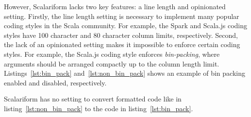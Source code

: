 However, Scalariform lacks two key features: a line length and opinionated setting.
Firstly, the line length setting is necessary to implement many popular coding styles in the Scala community.
For example, the Spark\autocite{xin_spark_2015} and Scala.js\autocite{doeraene_scala.js_2015} coding styles have 100 character and 80 character column limits, respectively.
Second, the lack of an opinionated setting makes it impossible to enforce certain coding styles.
For example, the Scala.js coding style enforces \emph{bin-packing}, where arguments should be arranged compactly up to the column length limit.
Listings~\ref{lst:bin_pack} and~\ref{lst:non_bin_pack} shows an example of bin packing enabled and disabled, respectively.
\begin{minipage}{.45\textwidth}
  
\end{minipage}
\hfil
\begin{minipage}{.45\textwidth}
  
\end{minipage}
Scalariform has no setting to convert formatted code like in listing~\ref{lst:non_bin_pack} to the code in listing~\ref{lst:bin_pack}.
